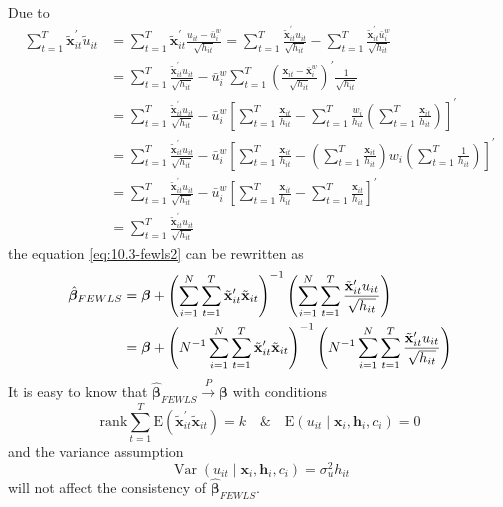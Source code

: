 \begin{enumerate}
\begin{enumerate}
\begin{gather}
        \end{gather}
        Due to
        \begin{align*}
            \sum_{t=1}^{T} \tilde{\mathbf{x}}_{i t}^{\prime} \tilde{u}_{i t} &= \sum_{t=1}^{T} \tilde{\mathbf{x}}_{i t}^{\prime} \frac{u_{it}-\bar{u}_i^w}{\sqrt{h_{it}}} = \sum_{t=1}^{T} \frac{\tilde{\mathbf{x}}_{i t}^{\prime} u_{it}}{\sqrt{h_{it}}} - \sum_{t=1}^{T} \frac{\tilde{\mathbf{x}}_{i t}^{\prime} \bar{u}_i^w}{\sqrt{h_{it}}} \\
            &= \sum_{t=1}^{T} \frac{\tilde{\mathbf{x}}_{i t}^{\prime} u_{it}}{\sqrt{h_{it}}} - \bar{u}_i^w \sum_{t=1}^{T} \left(\frac{\mathbf{x}_{it}-\bar{\mathbf{x}}_i^w}{\sqrt{h_{it}}}\right)^\prime \frac{1}{\sqrt{h_{it}}} \\
            &= \sum_{t=1}^{T} \frac{\tilde{\mathbf{x}}_{i t}^{\prime} u_{it}}{\sqrt{h_{it}}} - \bar{u}_i^w \left[ \sum_{t=1}^{T} \frac{\mathbf{x}_{it}}{h_{it}} -  \sum_{t=1}^{T} \frac{w_{i}}{h_{it}} \left(\sum_{t=1}^{T} \frac{\mathbf{x}_{i t}}{h_{it}}\right) \right]^\prime \\
            &= \sum_{t=1}^{T} \frac{\tilde{\mathbf{x}}_{i t}^{\prime} u_{it}}{\sqrt{h_{it}}} - \bar{u}_i^w \left[ \sum_{t=1}^{T} \frac{\mathbf{x}_{it}}{h_{it}} -  \left(\sum_{t=1}^{T} \frac{\mathbf{x}_{i t}}{h_{it}}\right) w_i \left(\sum_{t=1}^{T} \frac{1}{h_{it}}\right) \right]^\prime \\
            &= \sum_{t=1}^{T} \frac{\tilde{\mathbf{x}}_{i t}^{\prime} u_{it}}{\sqrt{h_{it}}} - \bar{u}_i^w \left[ \sum_{t=1}^{T} \frac{\mathbf{x}_{it}}{h_{it}} -  \sum_{t=1}^{T} \frac{\mathbf{x}_{it}}{h_{it}} \right]^\prime \\
            &= \sum_{t=1}^{T} \frac{\tilde{\mathbf{x}}_{i t}^{\prime} u_{it}}{\sqrt{h_{it}}}
        \end{align*}
        the equation \eqref{eq:10.3-fewls2} can be rewritten as
        \begin{align}
            \hat{\bm{\beta}}_{FEWLS} &= \bm{\beta} + \left(\sum_{i=1}^{N} \sum_{t=1}^{T} \tilde{\mathbf{x}}_{i t}^{\prime} \tilde{\mathbf{x}}_{i t}\right)^{-1}\left(\sum_{i=1}^{N} \sum_{t=1}^{T} \frac{\tilde{\mathbf{x}}_{i t}^{\prime} u_{it}}{\sqrt{h_{it}}} \right) \notag \\
            &= \bm{\beta} + \left(N^{-1}\sum_{i=1}^{N} \sum_{t=1}^{T} \tilde{\mathbf{x}}_{i t}^{\prime} \tilde{\mathbf{x}}_{i t}\right)^{-1} \left(N^{-1}\sum_{i=1}^{N} \sum_{t=1}^{T} \frac{\tilde{\mathbf{x}}_{i t}^{\prime} u_{it}}{\sqrt{h_{it}}} \right) \label{eq:10.3-fewls3}
        \end{align}
        It is easy to know that $\hat{\bm{\beta}}_{FEWLS} \xrightarrow{P} \bm{\beta}$ with conditions
        \[ \mathrm{rank} \sum_{t=1}^{T} \mathrm{E}\left(\tilde{\mathbf{x}}_{i t}^{\prime} \tilde{\mathbf{x}}_{i t}\right) = k\quad \& \quad\mathrm{E}\left(u_{i t} \mid \mathbf{x}_{i}, \mathbf{h}_{i}, c_{i}\right)=0 \]
        and the variance assumption
        \[ \operatorname{Var}\left(u_{i t} \mid \mathbf{x}_{i}, \mathbf{h}_{i}, c_{i}\right) = \sigma_u^2 h_{it} \]
        will not affect the consistency of $\hat{\bm{\beta}}_{FEWLS}$.
        

\end{enumerate}
\end{enumerate}
